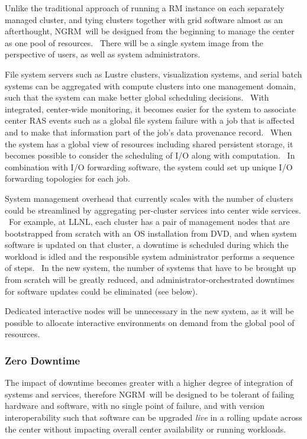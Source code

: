 \documentclass{article}
\newcommand{\ngrm}{NGRM}
\begin{document}
Unlike the traditional approach of running a RM instance on each separately
managed cluster, and tying clusters together with grid software almost as
an afterthought, \ngrm\ will be designed from the beginning to manage the
center as one pool of resources.  There will be a single system image
from the perspective of users, as well as system administrators.

File system servers such as Lustre clusters, visualization systems, and
serial batch systems can be aggregated with compute clusters into one
management domain, such that the system can make better global scheduling
decisions.  With integrated, center-wide monitoring, it becomes easier
for the system to associate center RAS events such as a global file system
failure with a job that is affected and to make that information part of
the job’s data provenance record.  When the system has a global view of
resources including shared persistent storage, it becomes possible to
consider the scheduling of I/O along with computation.  In combination with
I/O forwarding software, the system could set up unique I/O forwarding
topologies for each job.

System management overhead that currently scales with the number of clusters
could be streamlined by aggregating per-cluster services into center wide
services.  For example, at LLNL, each cluster has a pair of management
nodes that are bootstrapped from scratch with an OS installation from DVD,
and when system software is updated on that cluster, a downtime is
scheduled during which the workload is idled and the responsible system
administrator performs a sequence of steps.  In the new system, the
number of systems that have to be brought up from scratch will be
greatly reduced, and administrator-orchestrated downtimes for software
updates could be eliminated (see below).

Dedicated interactive nodes will be unnecessary in the new system, as it
will be possible to allocate interactive environments on demand from the
global pool of resources.

\subsubsection{Zero Downtime}

The impact of downtime becomes greater with a higher degree of integration
of systems and services, therefore \ngrm\ will be designed to be tolerant
of failing hardware and software, with no single point of failure, and
with version interoperability such that software can be upgraded {\em live}
in a rolling update across the center without impacting overall center
availability or running workloads.
\end{document}
